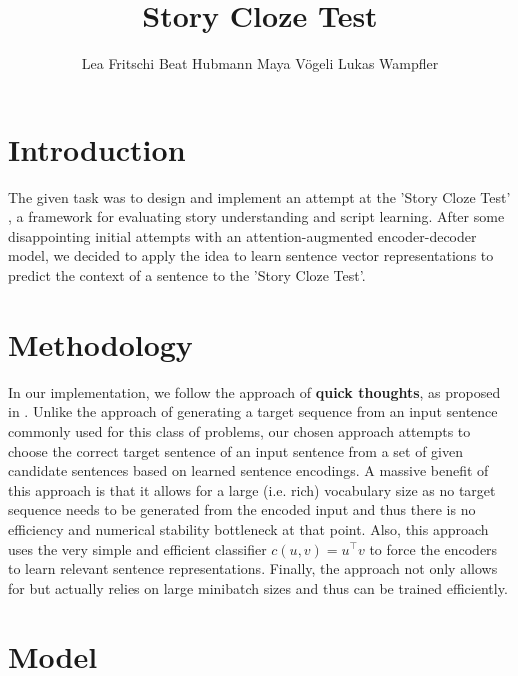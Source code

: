 \documentclass{article}
\title{Story Cloze Test}
\author{Lea Fritschi \qquad Beat Hubmann \qquad  Maya V\"ogeli \qquad   Lukas Wampfler}
\begin{document}

\maketitle


\section{Introduction}
The given task was to design and implement an attempt at the 'Story Cloze Test' \cite{DBLP:journals/corr/MostafazadehCHP16}, a framework for evaluating story understanding and script learning.
After some disappointing initial attempts with an attention-augmented encoder-decoder model, we decided to apply the idea to learn sentence vector representations to predict the context of a sentence \cite{eff_framework} to the 'Story Cloze Test'.


\section{Methodology}

In our implementation, we follow the approach of {\bf quick thoughts}, as proposed in \cite{eff_framework}. Unlike the approach of generating a target sequence from an input sentence commonly used for this class of problems, our chosen approach attempts to choose the correct target sentence of an input sentence from a set of given candidate sentences based on learned sentence encodings. A massive benefit of this approach is that it allows for a large (i.e. rich) vocabulary size as no target sequence needs to be generated from the encoded input and thus there is no efficiency and numerical stability bottleneck at that point. Also, this approach uses the very simple and efficient classifier $c(u, v) = u^\top v$ to force the encoders to learn relevant sentence representations. Finally, the approach not only allows for but actually relies on large minibatch sizes and thus can be trained efficiently.

\section{Model}
\end{document}
